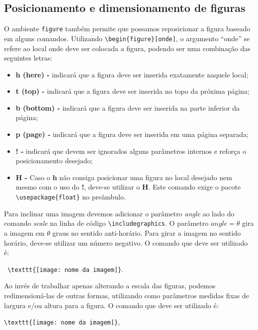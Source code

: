 \subsection{Posicionamento e dimensionamento de figuras}

\noindent O ambiente \verb|figure| tamb\'em permite que possamos reposicionar a figura baseado em alguns comandos. Utilizando \verb|\begin{figure}[onde]|, o argumento “onde” se refere ao local onde deve ser colocada a figura, podendo ser uma combina\c c\~ao das seguintes letras: \\

\begin{itemize}
    \item \textbf{h (here) -} indicará que a figura deve ser inserida exatamente naquele local;
    \item \textbf{t (top) -} indicará que a figura deve ser inserida no topo da próxima página;
    \item \textbf{b (bottom) -}  indicará que a figura deve ser inserida na parte inferior da página;
    \item \textbf{p (page) -} indicará que a figura deve ser inserida em uma p\'agina separada;
    \item \textbf{! -} indicará que devem ser ignorados alguns parâmetros internos e refor\c ca o posicionamento desejado;
    \item \textbf{H -} Caso o \textbf{h} não consiga posicionar uma figura no local desejado nem mesmo com o uso do \textbf{!}, deve-se utilizar o \textbf{H}. Este comando exige o pacote \verb|\usepackage{float}| no preâmbulo. 
\end{itemize}

\noindent Para inclinar uma imagem devemos adicionar o par\^ametro \textit{angle} ao lado do comando \textit{scale} na linha de código \verb|\includegraphics|. O par\^ametro $angle=\theta$ gira a imagem em $\theta$ graus no sentido anti-hor\'ario. Para girar a imagem no sentido hor\'ario, deve-se utilizar um n\'umero negativo. O comando que deve ser utilizado \'e:\\
\vspace{-0.3cm}
\begin{center}
\verb| \texttt{[image: nome da imagem]}|.   
\end{center}

\noindent Ao invés de trabalhar apenas alterando a escala das figuras, podemos
redimension\'a-las de outras formas, utilizando como par\^ametros medidas
fixas de largura e/ou altura para a figura. O comando que deve ser utilizado é:
\begin{center}
\verb|\texttt{[image: nome da imagem]}|,
\end{center}

